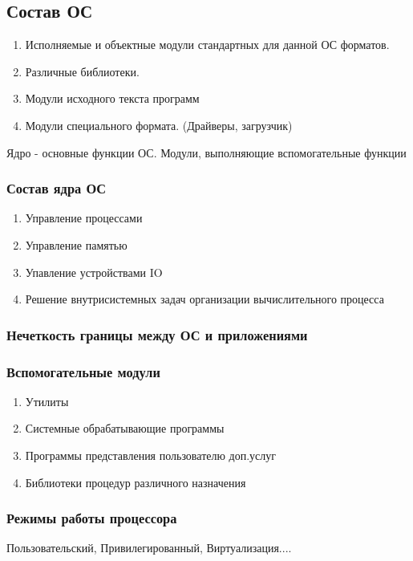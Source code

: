 \documentclass[a4paper]{article}
\begin{document}
\subsection{Состав ОС}

\begin{enumerate}
\item Исполняемые и объектные модули стандартных для данной ОС форматов.
\item Различные библиотеки.
\item Модули исходного текста программ
\item Модули специального формата. (Драйверы, загрузчик)
\end{enumerate}

Ядро - основные функции ОС.
Модули, выполняющие вспомогательные функции

\subsubsection{Состав ядра ОС}
\begin{enumerate}
\item Управление процессами
\item Управление памятью
\item Упавление устройствами IO
\item Решение внутрисистемных задач организации вычислительного процесса
\end{enumerate}
\subsubsection{Нечеткость границы между ОС и приложениями}

\subsubsection{Вспомогательные модули}
\begin{enumerate}
\item Утилиты 
\item Системные обрабатывающие программы
\item Программы представления пользователю доп.услуг
\item Библиотеки процедур различного назначения
\end{enumerate}
\subsubsection{Режимы работы процессора}
    Пользовательский, Привилегированный, Виртуализация....
\end{document}
